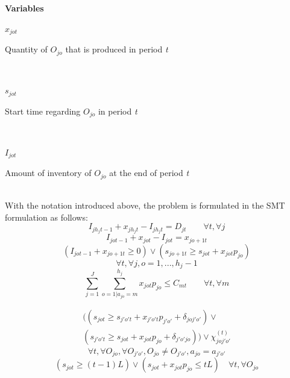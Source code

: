 \documentclass[letterpaper]{article} %
\begin{document}
\noindent\textbf{Variables}\\
\parbox{30pt}{\textit{$x_{jot}$}} 
\parbox[t]{207pt}{Quantity of $O_{jo}$ that is produced in period \textit{t}}\\
\parbox{30pt}{\textit{$s_{jot}$}} 
\parbox[t]{207pt}{Start time regarding $O_{jo}$ in period \textit{t}}\\
\parbox{30pt}{\textit{$I_{jot}$}} 
\parbox[t]{207pt}{Amount of inventory of $O_{jo}$ at the end of period \textit{t}}\\

With the notation introduced above, the problem is formulated in the SMT formulation  as follows:
\begin{equation}
I_{j h_j t-1}+x_{j h_j t} - I_{j h_j t} = D_{jt} \quad\quad  \forall t, \forall j
\end{equation}
\begin{equation}
I_{j o t-1}+x_{j o t} - I_{j o t} = x_{j o+1 t}
\end{equation}
\begin{equation}
(I_{j o t-1}+x_{j o+1 t} \geq 0) \vee  (s_{j o+1 t} \geq s_{jot}+x_{jot}p_{jo})
\end{equation}
$$\forall t, \forall j,o=1,...,h_{j}-1$$
\begin{equation}
\sum_{j=1}^{J} \sum_{o=1|a_{jo}=m}^{h_{j}} x_{j o t} p_{jo} \leq C_{mt} \quad\quad  \forall t, \forall m
\end{equation}

\begin{multline}
\Big( (s_{jot} \geq s_{j'o't} + x_{j'o't} p_{j'o'}+ \delta_{joj'o'}) \vee
\\
(s_{j'o't}\geq s_{jot} + x_{jot} p_{jo} + \delta_{j'o'jo}) \Big)\vee\chi_{joj'o'}^{(t)}
\end{multline}
$$\forall t, \forall O_{jo}, \forall O_{j'o'},
O_{jo}\neq O_{j'o'},a_{jo}=a_{j'o'}$$
\begin{equation}
(s_{jot} \geq (t-1)L) \vee  (s_{jot}+x_{jot}p_{jo} \leq tL) \quad  \forall t, \forall O_{jo}
\end{equation}
\end{document}
